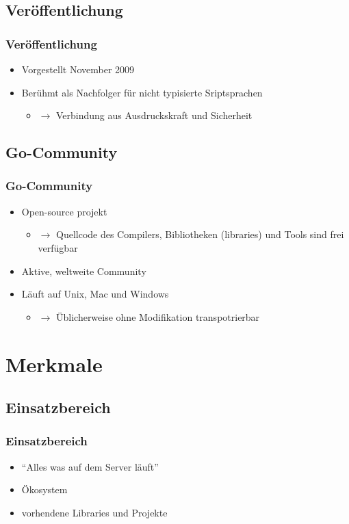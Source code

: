 \documentclass{beamer}
\begin{document}
\subsection{Ver\"offentlichung}
\begin{frame}
\frametitle{Ver\"offentlichung}

\begin{itemize}
\setlength{\itemsep}{60pt}
\item Vorgestellt November 2009
\item Ber\"uhmt als Nachfolger für nicht typisierte Sriptsprachen
\begin{itemize}
\item[] $\rightarrow$ Verbindung aus Ausdruckskraft und Sicherheit
\end{itemize}
\end{itemize}

\end{frame}

\subsection{Go-Community}
\begin{frame}
\frametitle{Go-Community}

\begin{itemize}
\setlength{\itemsep}{44pt}
\item Open-source projekt
\begin{itemize}
\item[] $\rightarrow$ Quellcode des Compilers, Bibliotheken (libraries) und Tools sind frei verfügbar
\end{itemize}
\item Aktive, weltweite Community
\item L\"auft auf Unix, Mac und Windows
\begin{itemize}
\item[] $\rightarrow$ \"Ublicherweise ohne Modifikation transpotrierbar
\end{itemize}
\end{itemize}

\end{frame}

\section{Merkmale}

\subsection{Einsatzbereich}
\begin{frame}
\frametitle{Einsatzbereich}

\begin{itemize}
\item ``Alles was auf dem Server l\"auft''
\item \"Okosystem
\item vorhendene Libraries und Projekte
\end{itemize}

\end{frame}
\end{document}
